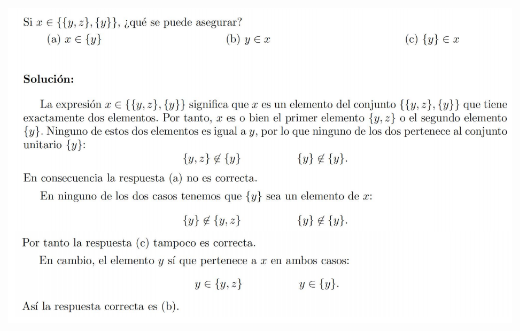 \documentclass[10pt,a4paper,openright]{book}
\begin{document}
\begin{center}
\includegraphics[scale=0.65]{Ejemplo 2}
\end{center}
\end{document}
